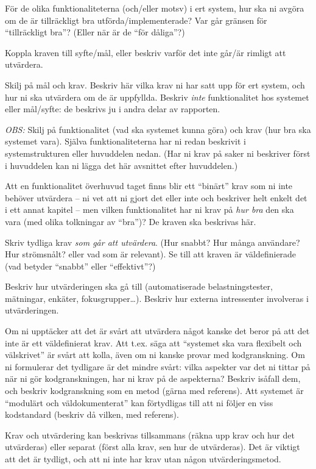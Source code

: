 För de olika funktionaliteterna (och/eller motsv) i ert system, hur ska ni avgöra om de är tillräckligt bra utförda/implementerade? Var går gränsen för ``tillräckligt bra''? (Eller när är de ``för dåliga''?)

Koppla kraven till syfte/mål, eller beskriv varför det inte går/är rimligt att utvärdera.

Skilj på mål och krav. Beskriv här vilka krav ni har satt upp för ert system, och hur ni ska utvärdera om de är uppfyllda. Beskriv \emph{inte} funktionalitet hos systemet eller mål/syfte: de beskrivs ju i andra delar av rapporten.

\emph{OBS:} Skilj på funktionalitet (vad ska systemet kunna göra) och krav (hur bra ska systemet vara). Själva funktionaliteterna har ni redan beskrivit i systemstrukturen eller huvuddelen nedan. (Har ni krav på saker ni beskriver först i huvuddelen kan ni lägga det här avsnittet efter huvuddelen.)

Att en funktionalitet överhuvud taget finns blir ett ``binärt'' krav som ni inte behöver utvärdera -- ni vet att ni gjort det eller inte och beskriver helt enkelt det i ett annat kapitel  -- men vilken funktionalitet har ni krav på \emph{hur bra} den ska vara (med olika tolkningar av ``bra'')? De kraven ska beskrivas här.

Skriv tydliga krav \emph{som går att utvärdera}.  (Hur snabbt? Hur många användare? Hur strömsnålt? eller vad som är relevant). Se till att kraven är väldefinierade (vad betyder ``snabbt'' eller ``effektivt''?)

Beskriv hur utvärderingen ska gå till (automatiserade belastningstester, mätningar, en\-käter, fokusgrupper\ldots).
Beskriv hur externa intressenter involveras i utvärderingen.

Om ni upptäcker att det är svårt att utvärdera något kanske det beror på att det inte är ett väldefinierat krav. Att t.ex. säga att ``systemet ska vara flexibelt och välskrivet'' är svårt att kolla, även om ni kanske provar med kodgranskning.
 Om ni formulerar det tydligare är det mindre svårt: vilka aspekter var det ni tittar på när ni gör kodgranskningen, har ni krav på de aspekterna? Beskriv isåfall dem, och beskriv kodgranskning som en metod (gärna med referens). Att systemet är ``modulärt och väldokumenterat'' kan förtydligas till att ni följer en viss kodstandard (beskriv då vilken, med referens).

Krav och utvärdering kan beskrivas tillsammans (räkna upp krav och hur det utvärderas) eller separat (först alla krav, sen hur de utvärderas). Det är viktigt att det är tydligt, och att ni inte har krav utan någon utvärderingsmetod.

